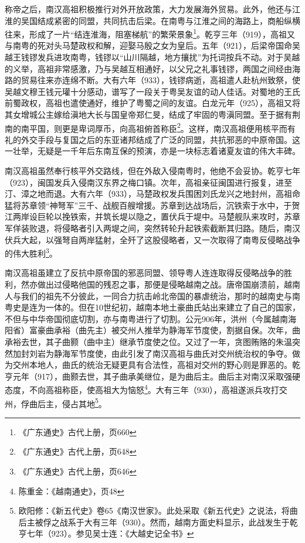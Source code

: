 称帝之后，南汉高祖积极推行对外开放政策，大力发展海外贸易。此外，他还与江淮的吴国结成紧密的同盟，共同抗击后梁。在南粤与江淮之间的海路上，商船纵横往来，形成了一片“结连淮海，阻塞梯航”的繁荣景象\footnote{《广东通史》古代上册，页660}。乾亨三年（919），高祖又与南粤的死对头马楚政权和解，迎娶马殷之女为皇后。五年（921），后梁帝国命吴越王钱镠发兵进攻南粤，钱镠以“山川隔越，地方攘扰”为托词按兵不动。对于吴越的义举，高祖非常感激，乃与吴越互相通好，以父兄之礼事钱镠，两国之间经由海路的贸易往来亦连绵不断。大有六年（933），钱镠病逝，高祖遣人赴杭州致祭，使吴越文穆王钱元瓘十分感动，谱写了一段关于粤吴友谊的动人佳话。对蜀地的王氏前蜀政权，高祖也遣使通好，维护了粤蜀之间的友谊。白龙元年（925），高祖又将其女增城公主嫁给滇地大长与国皇帝郑仁旻，结成了牢固的粤滇同盟。至于据有荆南的南平国，则更是卑词厚币，向高祖俯首称臣\footnote{《广东通史》古代上册，页648}。这样，南汉高祖便用核平而有礼的外交手段与复国之后的东亚诸邦结成了广泛的同盟，共抗邪恶的中原帝国。这一壮举，无疑是一千年后东南互保的预演，亦是一块标志着诸夏友谊的伟大丰碑。

南汉高祖虽然奉行核平外交路线，但在外敌入侵南粤时，他绝不会妥协。乾亨七年（923），闽国发兵入侵南汉东界之梅口镇。次年，高祖亲征闽国进行报复，进至汀、漳之地而退。大有六年（933），马楚政权发兵围困刘氏龙兴之地封州，高祖命猛将苏章领“神弩军”三千、战舰百艘增援。苏章到达战场后，沉铁索于水中，于贺江两岸设巨轮以挽铁索，并筑长堤以隐之，置伏兵于堤中。马楚舰队来攻时，苏章军佯装败退，将侵略者引入两堤之间，突然转轮升起铁索截断其归路。随后，南汉伏兵大起，以强弩自两岸猛射，全歼了这股侵略者，又一次取得了南粤反侵略战争的伟大胜利\footnote{《广东通史》古代上册，页646}。

南汉高祖虽建立了反抗中原帝国的邪恶同盟、领导粤人连连取得反侵略战争的胜利，然亦做出过侵略他国的残忍之事，那便是侵略越南之战。唐帝国崩溃前，越南人与我们的祖先不分彼此，一同合力抗击岭北帝国的暴虐统治，那时的越南史与南粤史是连为一体的。但在10世纪初，越南本地土豪曲氏站出来建立了自己的国家，不但与中华帝国彻底切割，亦与南粤进行了切割。公元906年，洪州（今属越南海阳省）富豪曲承裕（曲先主）被交州人推举为静海军节度使，割据自保。次年，曲承裕去世，其子曲颢（曲中主）继承节度使之位。又过了一年，贪图贿赂的朱温突然加封刘岩为静海军节度使，由此引发了南汉高祖与曲氏对交州统治权的争夺。做为交州本地人，曲氏的统治无疑更具有合法性，高祖对交州的野心则是罪恶的。乾亨元年（917），曲颢去世，其子曲承美继位，是为曲后主。曲后主对南汉采取强硬态度，不向高祖称臣，使高祖大为恼怒\footnote{陈重金：《越南通史》，页48}。大有三年（930），高祖遂派兵攻打交州，俘曲后主，侵占其地\footnote{欧阳修：《新五代史》卷65《南汉世家》。此处采取《新五代史》之说法，将曲后主被俘之战系于大有三年（930）。然而，越南方面史料显示，此战发生于乾亨七年（923）。参见吴士连：《大越史记全书》}。

